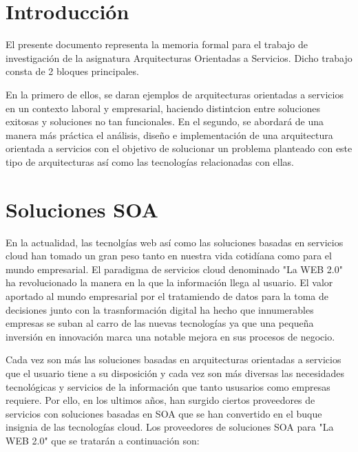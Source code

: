 \documentclass[a4paper,11pt]{book}
\begin{document}


\tableofcontents
\listoffigures

%

%


\chapter{Introducción}

El presente documento representa la memoria formal para el trabajo de investigación de la asignatura Arquitecturas Orientadas a Servicios. Dicho trabajo consta de 2 bloques principales.


En la primero de ellos, se daran ejemplos de arquitecturas orientadas a servicios en un contexto laboral y empresarial, haciendo distintcion entre soluciones exitosas y soluciones no tan funcionales. En el segundo, se abordará de una manera más práctica el análisis, diseño e implementación de una arquitectura orientada a servicios con el objetivo de solucionar un problema planteado con este tipo de arquitecturas así como las tecnologías relacionadas con ellas. 

\chapter{Soluciones SOA}

En la actualidad, las tecnolgías web así como las soluciones basadas en servicios cloud han tomado un gran peso tanto en nuestra vida cotidíana como para el mundo empresarial. El paradigma de servicios cloud denominado "La WEB 2.0" ha revolucionado la manera en la que la información llega al usuario.  El valor aportado al mundo empresarial por el tratamiendo de datos para la toma de decisiones junto con la trasnformación digital ha hecho que innumerables empresas se suban al carro de las nuevas tecnologías ya que una pequeña inversión en innovación marca una notable mejora en sus procesos de negocio.

Cada vez son más las soluciones basadas en arquitecturas orientadas a servicios que el usuario tiene a su disposición y cada vez son más diversas las necesidades tecnológicas y servicios de la información que tanto ususarios como empresas requiere. Por ello, en los ultimos años, han surgido ciertos proveedores de servicios con soluciones basadas en SOA que se han convertido en el buque insignia de las tecnologías cloud. Los proveedores de soluciones SOA para "La WEB 2.0" que se tratarán a continuación son:  
\end{document}
